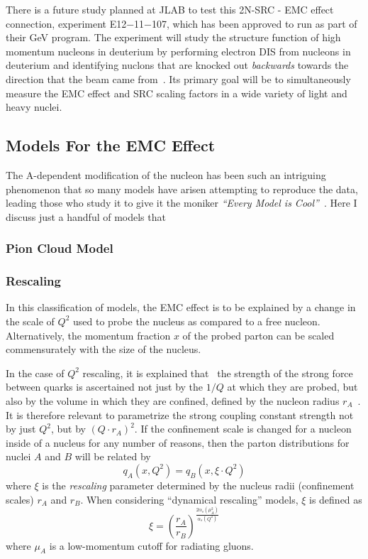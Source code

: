 There is a future study planned at JLAB to test this 2N-SRC - EMC effect connection, experiment E12−11−107, which has been approved to run as part of their \unit[12]{GeV} program. The experiment will study the structure function of high momentum nucleons in deuterium by performing electron DIS from nucleons in deuterium and identifying nuclons that are knocked out \emph{backwards} towards the direction that the beam came from~\cite{Hen:2014vua}. Its primary goal will be to simultaneously measure the EMC effect and SRC scaling factors in a wide variety of light and heavy nuclei.

\subsection{Models For the EMC Effect}

The A-dependent modification of the nucleon has been such an intriguing phenomenon that so many models have arisen attempting to reproduce the data, leading those who study it to give it the moniker \emph{``Every Model is Cool''}~\cite{Miller:1988hj}. Here I discuss just a handful of models that 

\subsubsection{Pion Cloud Model}


\subsubsection{Rescaling}

In this classification of models, the EMC effect is to be explained by a change in the scale of $Q^2$ used to probe the nucleus as compared to a free nucleon. Alternatively, the momentum fraction $x$ of the probed parton can be scaled commensurately with the size of the nucleus.

In the case of $Q^2$ rescaling, it is explained that~\cite{Rith:2014tma} the strength of the strong force between quarks is ascertained not just by the $1/Q$ at which they are probed, but also by the volume in which they are confined, defined by the nucleon radius $r_A$~\cite{Close:1983tn, Nachtmann:1983py}.  It is therefore relevant to parametrize the strong coupling constant strength not by just $Q^2$, but by $(Q\cdot r_A)^2$.  If the confinement scale is changed for a nucleon inside of a nucleus for any number of reasons, then the parton distributions for nuclei $A$ and $B$ will be related by
\begin{equation}
q_A(x,Q^2) = q_B(x,\xi\cdot Q^2)
\end{equation}
where $\xi$ is the \emph{rescaling} parameter determined by the nucleus radii (confinement scales) $r_A$ and $r_B$. When considering ``dynamical rescaling'' models, $\xi$ is defined as
\begin{equation}
\xi = \left(\frac{r_A}{r_B}\right)^{\frac{2\alpha_s (\mu_A^2)}{\alpha_s(Q^2)}}
\end{equation}
where $\mu_A$ is a low-momentum cutoff for radiating gluons.


